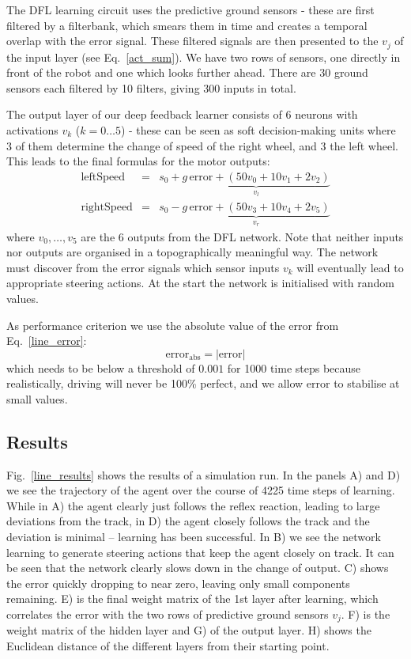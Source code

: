 \documentclass{aamas2018}
\begin{document}
The DFL learning circuit uses the predictive ground sensors - these
are first filtered by a filterbank, which smears them in time and
creates a temporal overlap with the error signal. These filtered
signals are then presented to the $v_j$ of the input layer (see
Eq.~\ref{act_sum}). We have two rows of sensors, one directly in front
of the robot and one which looks further ahead. There are 30 ground
sensors each filtered by 10 filters, giving 300 inputs in total.

The output layer of our deep feedback learner consists of 6 neurons
with activations $v_k$ ($k=0 \ldots 5$) - these can be seen as soft
decision-making units where 3 of them determine the change of speed of
the right wheel, and 3 the left wheel. This leads to the
final formulas for the motor outputs:
\begin{eqnarray}
  \mathrm{leftSpeed} &=& s_0 + \underbrace{g\, \mathrm{error} + \left( 50 v_0 + 10 v_1 + 2 v_2 \right)}_{v_l} \\
  \mathrm{rightSpeed} &=& s_0 - \underbrace{g\, \mathrm{error} + \left( 50 v_3 + 10 v_4 + 2 v_5 \right)}_{v_r}
\end{eqnarray}
where $v_0, \ldots, v_5$ are the 6 outputs from the DFL network. Note
that neither inputs nor outputs are organised in a topographically
meaningful way. The network must discover from the error signals
which sensor inputs $v_k$ will eventually lead to appropriate steering
actions. At the start the network is initialised with random values.

As performance criterion we use the absolute value of the error from
Eq.~\ref{line_error}:
\begin{equation}
  \mathrm{error}_\mathrm{abs} =  |\mathrm{error}| \label{line_abserr}
\end{equation}
which needs to be below a threshold of $0.001$ for 1000 time steps
because realistically, driving will never be 100\% perfect, and we
allow $\mathrm{error}$ to stabilise at small values.


\subsection{Results}
Fig.~\ref{line_results} shows the results of a simulation run. In the
panels A) and D) we see the trajectory of the agent over the course of
4225 time steps of learning. While in A) the agent clearly just
follows the reflex reaction, leading to large deviations from the
track, in D) the agent closely follows the track and the deviation is
minimal -- learning has been successful. In B) we see the network
learning to generate steering actions that keep the agent closely on track.
It can be seen that the network clearly slows down in the change of
output.  C) shows the error quickly dropping to near zero, leaving
only small components remaining. E) is the final weight matrix of the
1st layer after learning, which correlates the error with the two rows
of predictive ground sensors $v_j$. F) is the weight matrix of the
hidden layer and G) of the output layer. H) shows the Euclidean
distance of the different layers from their starting point.
\end{document}
